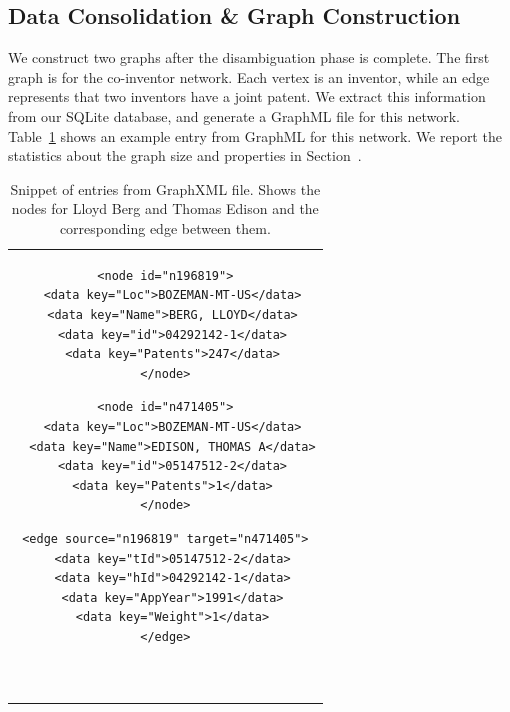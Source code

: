 \subsection{Data Consolidation \& Graph Construction}

We construct two graphs after the disambiguation phase is complete. 
The first graph is for the co-inventor network. 
Each vertex is an inventor, while an edge represents that two inventors have a joint patent. 
We extract this information from our SQLite database, and generate a GraphML file for this network.
Table~\ref{listing} shows an example entry from GraphML for this network.
We report the statistics about the graph size and properties in Section~\cite{sec:eval}.

\begin{table}[h] 
  \centering
  \begin{tabular}{@{}c@{}} 

  \begin{minipage}{0.25\linewidth}

\begin{lstlisting}[]
<node id="n196819">
  <data key="Loc">BOZEMAN-MT-US</data>
  <data key="Name">BERG, LLOYD</data>
  <data key="id">04292142-1</data>
  <data key="Patents">247</data>
</node>
\end{lstlisting}

  \end{minipage}
  \hspace{0.05\linewidth}
  \begin{minipage}{0.3\linewidth}

\begin{lstlisting}[]
<node id="n471405">
  <data key="Loc">BOZEMAN-MT-US</data>
  <data key="Name">EDISON, THOMAS A</data>
  <data key="id">05147512-2</data>
  <data key="Patents">1</data>
</node>
\end{lstlisting}

  \end{minipage}
  \hspace{0.05\linewidth}
  \begin{minipage}{0.3\linewidth}

\begin{lstlisting}[]
<edge source="n196819" target="n471405">
  <data key="tId">05147512-2</data>
  <data key="hId">04292142-1</data>
  <data key="AppYear">1991</data>
  <data key="Weight">1</data>
</edge>



\end{lstlisting}

  \end{minipage}
  
  \end{tabular}

\label{listing}
\caption{\footnotesize Snippet of entries from GraphXML file. Shows the nodes for Lloyd Berg and Thomas Edison and the corresponding edge between them.}
\end{table}
